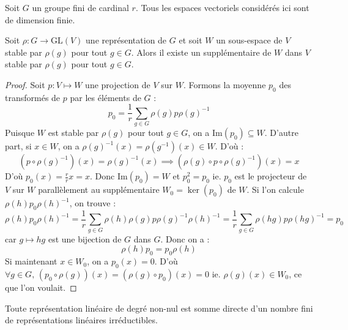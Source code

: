 






	Soit $G$ un groupe fini de cardinal $r$. Tous les espaces vectoriels considérés ici sont de dimension finie.

	\medskip

	\begin{lemma}
		\label{theoreme-de-maschke-1}
		Soit $\rho : G \rightarrow \mathrm{GL}(V)$ une représentation de $G$ et soit $W$ un sous-espace de $V$ stable par $\rho(g)$ pour tout $g \in G$. Alors il existe un supplémentaire de $W$ dans $V$ stable par $\rho(g)$ pour tout $g \in G$.
	\end{lemma}

	\begin{proof}
		Soit $p : V \mapsto W$ une projection de $V$ sur $W$. Formons la moyenne $p_0$ des transformés de $p$ par les éléments de $G$ :
		\[ p_0 = \frac{1}{r} \sum_{g \in G} \rho(g) p \rho(g)^{-1} \]
		Puisque $W$ est stable par $\rho(g)$ pour tout $g \in G$, on a $\mathrm{Im}(p_0) \subseteq W$.
		\newpar
		D'autre part, si $x \in W$, on a $\rho(g)^{-1}(x) = \rho(g^{-1})(x) \in W$. D'où :
		\[ (p \circ \rho(g)^{-1})(x) = \rho(g)^{-1}(x) \implies (\rho(g) \circ p \circ \rho(g)^{-1})(x) = x \]
		D'où $p_0(x) = \frac{r}{r} x = x$. Donc $\mathrm{Im}(p_0) = W$ et $p_0^2 = p_0$ ie. $p_0$ est le projecteur de $V$ sur $W$ parallèlement au supplémentaire $W_0 = \ker(p_0)$ de $W$.
		\newpar
		Si l'on calcule $\rho(h) p_0 \rho(h)^{-1}$, on trouve :
		\[ \rho(h) p_0 \rho(h)^{-1} = \frac{1}{r} \sum_{g \in G} \rho(h) \rho(g) p \rho(g)^{-1} \rho(h)^{-1} = \frac{1}{r} \sum_{g \in G} \rho(hg) p \rho(hg)^{-1} = p_0 \]
		car $g \mapsto hg$ est une bijection de $G$ dans $G$. Donc on a :
		\[ \rho(h) p_0 = p_0 \rho(h) \]
		Si maintenant $x \in W_0$, on a $p_0(x) = 0$. D'où $\forall g \in G, \, (p_0 \circ \rho(g))(x) = (\rho(g) \circ p_0)(x) = 0$ ie. $\rho(g)(x) \in W_0$, ce que l'on voulait.
	\end{proof}

	\begin{theorem}[Maschke]
		Toute représentation linéaire de degré non-nul est somme directe d'un nombre fini de représentations linéaires irréductibles.
	\end{theorem}

